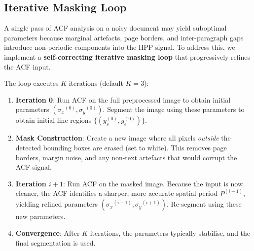 \documentclass[12pt, a4paper]{article}
\begin{document}
\vspace{0.3em}
\noindent{}


\subsection{Iterative Masking Loop}
\label{sec:iterative_loop}

A single pass of ACF analysis on a noisy document may yield suboptimal parameters because marginal artefacts, page borders, and inter-paragraph gaps introduce non-periodic components into the HPP signal. To address this, we implement a \textbf{self-correcting iterative masking loop} that progressively refines the ACF input.

The loop executes $K$ iterations (default $K = 3$):

\begin{enumerate}
    \item \textbf{Iteration 0}: Run ACF on the full preprocessed image to obtain initial parameters $({\sigma_x}^{(0)}, {\sigma_y}^{(0)})$. Segment the image using these parameters to obtain initial line regions $\{(y_s^{(0)}, y_e^{(0)})\}$.

    \item \textbf{Mask Construction}: Create a new image where all pixels \emph{outside} the detected bounding boxes are erased (set to white). This removes page borders, margin noise, and any non-text artefacts that would corrupt the ACF signal.

    \item \textbf{Iteration $i+1$}: Run ACF on the masked image. Because the input is now cleaner, the ACF identifies a sharper, more accurate spatial period $P^{(i+1)}$, yielding refined parameters $({\sigma_x}^{(i+1)}, {\sigma_y}^{(i+1)})$. Re-segment using these new parameters.

    \item \textbf{Convergence}: After $K$ iterations, the parameters typically stabilise, and the final segmentation is used.
\end{enumerate}
\end{document}

